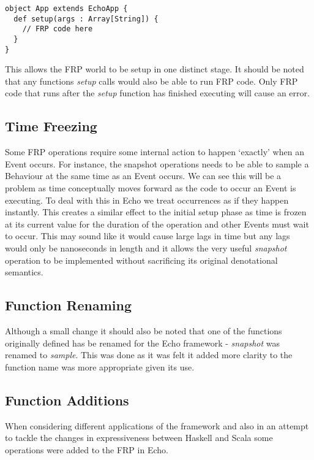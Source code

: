 \begin{verbatim}
object App extends EchoApp {
  def setup(args : Array[String]) {
    // FRP code here
  }
}
\end{verbatim}

      This allows the FRP world to be setup in one distinct stage. It should be noted that
      any functions \emph{setup} calls would also be able to run FRP code. Only FRP code that runs
      after the \emph{setup} function has finished executing will cause an error.
      
    \subsection{Time Freezing}
      Some FRP operations require some internal action to happen `exactly' when an Event occurs. For instance,
      the snapshot operations needs to be able to sample a Behaviour at the same time as an Event occurs.
      We can see this will be a problem as time conceptually moves forward as the code to
      occur an Event is executing. To deal with this in Echo we treat occurrences as if they happen instantly. This
      creates a similar effect to the initial setup phase as time is frozen at its current value for the duration
      of the operation and other Events must wait to occur. This may sound like it would cause large lags in time
      but any lags would only be nanoseconds in length and it allows the very useful \emph{snapshot} operation
      to be implemented without sacrificing its original denotational semantics.
    
    \subsection{Function Renaming}
      Although a small change it should also be noted that one of the functions originally defined
      has be renamed for the Echo framework - \emph{snapshot} was renamed to \emph{sample}. This was done as
      it was felt it added more clarity to the function name was more appropriate given its use.
      
    \subsection{Function Additions}
      When considering different applications of the framework and also in an attempt to
      tackle the changes in expressiveness between Haskell and Scala some operations
      were added to the FRP in Echo.
      
